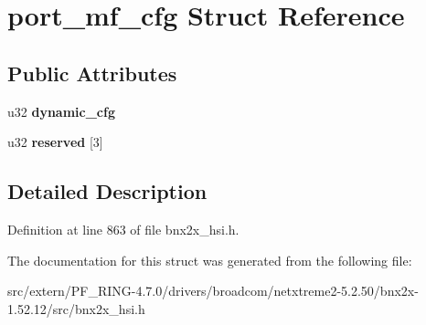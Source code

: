 \hypertarget{structport__mf__cfg}{
\section{port\_\-mf\_\-cfg Struct Reference}
\label{structport__mf__cfg}
}
\subsection*{Public Attributes}
\begin{DoxyCompactItemize}
\item 
\hypertarget{structport__mf__cfg_a1582ca38a5e2d3a0037f0afcdd4b5727}{
u32 {\bfseries dynamic\_\-cfg}}
\label{structport__mf__cfg_a1582ca38a5e2d3a0037f0afcdd4b5727}

\item 
\hypertarget{structport__mf__cfg_a49acad40859c974e1f75652c1e83ad3f}{
u32 {\bfseries reserved} \mbox{[}3\mbox{]}}
\label{structport__mf__cfg_a49acad40859c974e1f75652c1e83ad3f}

\end{DoxyCompactItemize}


\subsection{Detailed Description}


Definition at line 863 of file bnx2x\_\-hsi.h.



The documentation for this struct was generated from the following file:\begin{DoxyCompactItemize}
\item 
src/extern/PF\_\-RING-\/4.7.0/drivers/broadcom/netxtreme2-\/5.2.50/bnx2x-\/1.52.12/src/bnx2x\_\-hsi.h\end{DoxyCompactItemize}
